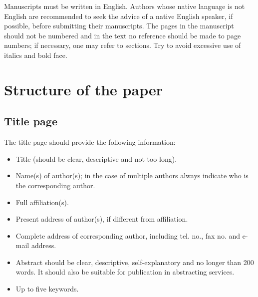 \documentclass{iosart2c}
\begin{document}
Manuscripts must be written in English. Authors whose native language is not English are recommended to seek the advice of a native English speaker,
if possible, before submitting their manuscripts. The pages in the manuscript should not be numbered and in the text no reference should be made
to page numbers; if necessary, one may refer to sections. Try to avoid excessive use of italics and bold face.


\section{Structure of the paper}
\subsection{Title page}

The title page should provide the following information:

\begin{itemize}
\item Title (should be clear, descriptive and not too long).
\item  Name(s) of author(s); in the case of multiple authors always indicate who is the corresponding
author.
\item  Full affiliation(s).
\item  Present address of author(s), if different from affiliation.
\item  Complete address of corresponding author, including tel. no., fax no. and e-mail
address.
\item  Abstract should be clear, descriptive, self-expla\-na\-tory and no longer than 200
words. It should also be suitable for publication in abstracting services.
\item  Up to five keywords.
\end{itemize}
\end{document}
